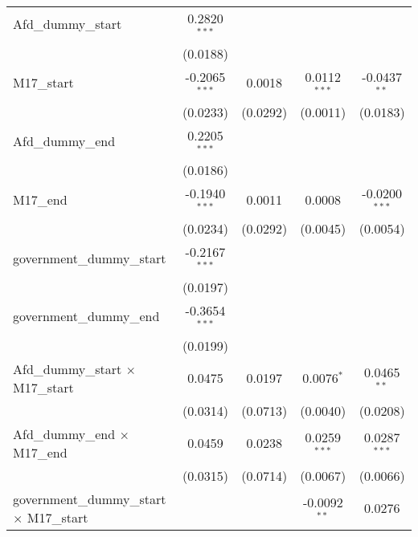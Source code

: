 \documentclass[10pt,a4paper]{article}
\begin{document}
\begin{tabular}{lcccc}
   Afd\_dummy\_start                                & 0.2820$^{***}$  &                &                 &   \\   
                                                    & (0.0188)        &                &                 &   \\   
   M17\_start                                       & -0.2065$^{***}$ & 0.0018         & 0.0112$^{***}$  & -0.0437$^{**}$\\   
                                                    & (0.0233)        & (0.0292)       & (0.0011)        & (0.0183)\\   
   Afd\_dummy\_end                                  & 0.2205$^{***}$  &                &                 &   \\   
                                                    & (0.0186)        &                &                 &   \\   
   M17\_end                                         & -0.1940$^{***}$ & 0.0011         & 0.0008          & -0.0200$^{***}$\\   
                                                    & (0.0234)        & (0.0292)       & (0.0045)        & (0.0054)\\   
   government\_dummy\_start                         & -0.2167$^{***}$ &                &                 &   \\   
                                                    & (0.0197)        &                &                 &   \\   
   government\_dummy\_end                           & -0.3654$^{***}$ &                &                 &   \\   
                                                    & (0.0199)        &                &                 &   \\   
   Afd\_dummy\_start $\times$ M17\_start            & 0.0475          & 0.0197         & 0.0076$^{*}$    & 0.0465$^{**}$\\   
                                                    & (0.0314)        & (0.0713)       & (0.0040)        & (0.0208)\\   
   Afd\_dummy\_end $\times$ M17\_end                & 0.0459          & 0.0238         & 0.0259$^{***}$  & 0.0287$^{***}$\\   
                                                    & (0.0315)        & (0.0714)       & (0.0067)        & (0.0066)\\   
   government\_dummy\_start $\times$ M17\_start     &                 &                & -0.0092$^{**}$  & 0.0276\\   

\end{tabular}
\end{document}
